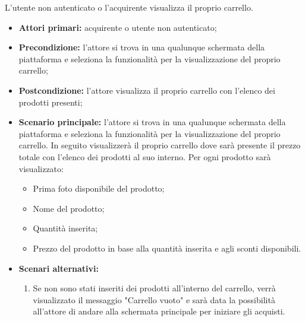 
\label{visualizzazione-carrello}

L'utente non autenticato o l'acquirente visualizza il proprio carrello.
\begin{itemize}
    \item \textbf{Attori primari:} acquirente o utente non autenticato;
    \item \textbf{Precondizione:} l'attore si trova in una qualunque schermata della piattaforma e seleziona la funzionalità per la visualizzazione del proprio carrello;
    \item \textbf{Postcondizione:} l'attore visualizza il proprio carrello con l'elenco dei prodotti presenti;
    \item \textbf{Scenario principale:} l'attore si trova in una qualunque schermata della piattaforma e seleziona la funzionalità per la visualizzazione del proprio carrello. In seguito visualizzerà il proprio carrello dove sarà presente il prezzo totale con l'elenco dei prodotti al suo interno. Per ogni prodotto sarà visualizzato:
    \begin{itemize}
        \item Prima foto disponibile del prodotto;
        \item Nome del prodotto;
        \item Quantità inserita;
        \item Prezzo del prodotto in base alla quantità inserita e agli sconti disponibili.
    \end{itemize}
    \item \textbf{Scenari alternativi:} 
    \begin{enumerate}[label=\lett]
        \item Se non sono stati inseriti dei prodotti all'interno del carrello, verrà visualizzato il messaggio "Carrello vuoto" e sarà data la possibilità all'attore di andare alla schermata principale per iniziare gli acquisti.
    \end{enumerate}
\end{itemize}


\label{eliminazione-prodotto-dal-carrello}


